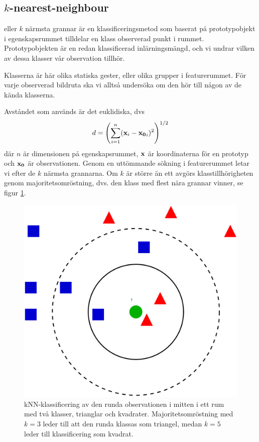 \documentclass[../rapport_MVEX01-11-05]{subfiles}
\begin{document}
\subsection{$k$-nearest-neighbour}\label{sec:knn}

\knn eller $k$ närmsta grannar är en klassificeringsmetod som baserat på
prototypobjekt i egenskapsrummet tilldelar en klass observerad punkt i rummet.
Prototypobjekten är en redan klassificerad inlärningsmängd, och vi undrar vilken
av dessa klasser vår observation tillhör.

Klasserna är här olika statiska gester, eller olika grupper i featurerummet. För
varje observerad bildruta ska vi alltså undersöka om den hör till någon av de
kända klasserna.

Avståndet som används är det euklidiska, dvs
\begin{equation*}
    d = \left(\sum_{i=1}^n(\mathbf{x}_i-\mathbf{x_0}_i)^2\right)^{1/2}
\end{equation*}
där $n$ är dimensionen på egenskapsrummet, $\mathbf{x}$ är koordinaterna för en
prototyp och $\mathbf{x_0}$ är observationen. Genom en uttömmande sökning i
featurerummet letar vi efter de $k$ närmsta grannarna. Om $k$ är större än ett
avgörs klasstillhörigheten genom majoritetsomröstning, dvs. den klass med flest
nära grannar vinner, se figur \ref{fig:knn-overview}.

\begin{figure}[!htb]
    \begin{center}
\includegraphics[width=0.75\columnwidth]{bilder/2000px-KnnClassification.png}
    \end{center}
    \caption{kNN-klassificering av den runda observationen i mitten i ett rum
    med två klasser, trianglar och kvadrater. Majoritetsomröstning
    med $k=3$ leder till att den runda klassas som triangel, medan $k=5$ leder
    till klassificering som kvadrat.}
    \label{fig:knn-overview}
\end{figure}
\end{document}
